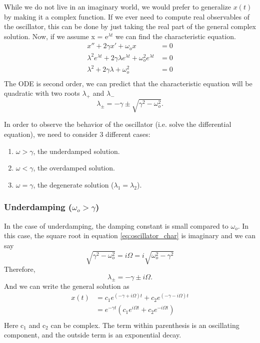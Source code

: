 \documentclass{article}
\newcommand{\be}{\begin{equation}}
\newcommand{\ee}{\end{equation}}
\newcommand{\benum}{\begin{enumerate}}
\newcommand{\eenum}{\end{enumerate}}
\begin{document}
While we do not live in an imaginary world, we would prefer to generalize $x(t)$ by making it a complex function.
If we ever need to compute real observables of the oscillator, this can be done by just taking the real part of the general complex solution.
Now, if we assume x = e$^{\lambda t}$ we can find the characteristic equation.
\be
\begin{split}
    x'' + 2\gamma x' + \omega_o x &= 0\\
    \lambda^2 e^{\lambda t} + 2\gamma\lambda e^{\lambda t} + \omega_o^2 e^{\lambda t} &= 0\\
    \lambda^2 + 2\gamma\lambda  + \omega_o^2 &= 0\\
\end{split}
\ee
The ODE is second order, we can predict that the characteristic equation will be quadratic with two roots $\lambda_+$ and $\lambda_-$
\be \label{eq:oscillator_char}
\lambda_{\pm} = -\gamma \pm \sqrt{\gamma^2 - \omega_o^2} .
\ee

In order to observe the behavior of the oscillator (i.e. solve the differential equation), we need to consider 3 different cases:
\benum
\item $\omega > \gamma$, the underdamped solution.
\item $\omega < \gamma$, the overdamped solution.
\item $\omega = \gamma$, the degenerate solution ($\lambda_1 = \lambda_2$).
\eenum

\subsubsection*{Underdamping ($\omega_o > \gamma$)}
In the case of underdamping, the damping constant is small compared to $\omega_o$. In this case, the square root in equation \ref{eq:oscillator_char} is imaginary and we can say
\be
\sqrt{\gamma^2 - \omega_o^2} = i \Omega = i \sqrt{\omega_o^2 - \gamma^2}
\ee
Therefore,
\be
\lambda_{\pm} = -\gamma \pm i \Omega .
\ee
And we can write the general solution as
\be
\begin{split}
x(t) &= c_1 e^{(-\gamma + i \Omega)t} + c_2 e^{(-\gamma - i \Omega)t} \\
&= e^{-\gamma t}(c_1 e^{i \Omega t} + c_2 e^{-i \Omega t}) \\
\end{split}
\ee
Here c$_1$ and c$_2$ can be complex.
The term within parenthesis is an oscillating component, and the outside term is an exponential decay.
\end{document}
